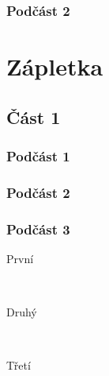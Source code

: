 \documentclass[12pt,a4paper]{article} %
\begin{document}

\subsubsection{Podčást 2} %

\lipsum[4] %


\section{Zápletka} %

\lipsum[5] %


\subsection{Část 1} %

\subsubsection{Podčást 1} %

\lipsum[6] %


\subsubsection{Podčást 2} %



\subsubsection{Podčást  3} %

\begin{description} %

\item[První] \hfill \\
\lipsum[9] %

\item[Druhý] \hfill \\
\lipsum[10] %

\item[Třetí] \hfill \\
\lipsum[11] %

\end{description} 
\end{document}
